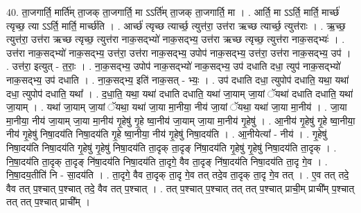 \documentclass[17pt]{extarticle}
\begin{document}
40. ता॒जगार्ति॒ मार्ति॑म् ता॒जक् ता॒जगार्ति॒ मा ऽऽर्ति॑म् ता॒जक् ता॒जगार्ति॒ मा । . आर्ति॒ मा ऽऽर्ति॒ मार्ति॒ मार्च्छ॑ त्यृच्छ॒ त्या ऽऽर्ति॒ मार्ति॒ मार्च्छ॑ति । . आर्च्छ॑ त्यृच्छ त्यार्च्छ॒ त्युत्त॑रा॒ उत्त॑रा ऋच्छ त्यार्च्छ॒ त्युत्त॑राः । . ऋ॒च्छ॒ त्युत्त॑रा॒ उत्त॑रा ऋच्छ त्यृच्छ॒ त्युत्त॑रा नाक॒सद्भ्यो॑ नाक॒सद्भ्य॒ उत्त॑रा ऋच्छ त्यृच्छ॒ त्युत्त॑रा नाक॒सद्भ्यः॑ । . उत्त॑रा नाक॒सद्भ्यो॑ नाक॒सद्भ्य॒ उत्त॑रा॒ उत्त॑रा नाक॒सद्भ्य॒ उपोप॑ नाक॒सद्भ्य॒ उत्त॑रा॒ उत्त॑रा नाक॒सद्भ्य॒ उप॑ । . उत्त॑रा॒ इत्युत् - त॒राः॒ । . ना॒क॒सद्भ्य॒ उपोप॑ नाक॒सद्भ्यो॑ नाक॒सद्भ्य॒ उप॑ दधाति दधा॒ त्युप॑ नाक॒सद्भ्यो॑ नाक॒सद्भ्य॒ उप॑ दधाति । . ना॒क॒सद्भ्य॒ इति॑ नाक॒सत् - भ्यः॒ । . उप॑ दधाति दधा॒ त्युपोप॑ दधाति॒ यथा॒ यथा॑ दधा॒ त्युपोप॑ दधाति॒ यथा᳚ । . द॒धा॒ति॒ यथा॒ यथा॑ दधाति दधाति॒ यथा॑ जा॒याम् जा॒यां ॅयथा॑ दधाति दधाति॒ यथा॑ जा॒याम् । . यथा॑ जा॒याम् जा॒यां ॅयथा॒ यथा॑ जा॒या मा॒नीया॒ नीय॑ जा॒यां ॅयथा॒ यथा॑ जा॒या मा॒नीय॑ । . जा॒या मा॒नीया॒ नीय॑ जा॒याम् जा॒या मा॒नीय॑ गृ॒हेषु॑ गृ॒हे ष्वा॒नीय॑ जा॒याम् जा॒या मा॒नीय॑ गृ॒हेषु॑ । . आ॒नीय॑ गृ॒हेषु॑ गृ॒हे ष्वा॒नीया॒ नीय॑ गृ॒हेषु॑ निषा॒दय॑ति निषा॒दय॑ति गृ॒हे ष्वा॒नीया॒ नीय॑ गृ॒हेषु॑ निषा॒दय॑ति । . आ॒नीयेत्या᳚ - नीय॑ । . गृ॒हेषु॑ निषा॒दय॑ति निषा॒दय॑ति गृ॒हेषु॑ गृ॒हेषु॑ निषा॒दय॑ति ता॒दृक् ता॒दृङ् नि॑षा॒दय॑ति गृ॒हेषु॑ गृ॒हेषु॑ निषा॒दय॑ति ता॒दृक् । . नि॒षा॒दय॑ति ता॒दृक् ता॒दृङ् नि॑षा॒दय॑ति निषा॒दय॑ति ता॒दृगे॒ वैव ता॒दृङ् नि॑षा॒दय॑ति निषा॒दय॑ति ता॒दृ गे॒व । . नि॒षा॒दय॒तीति॑ नि - सा॒दय॑ति । . ता॒दृगे॒ वैव ता॒दृक् ता॒दृ गे॒व तत् तदे॒व ता॒दृक् ता॒दृ गे॒व तत् । . ए॒व तत् तदे॒ वैव तत् प॒श्चात् प॒श्चात् तदे॒ वैव तत् प॒श्चात् । . तत् प॒श्चात् प॒श्चात् तत् तत् प॒श्चात् प्राची॒म् प्राची᳚म् प॒श्चात् तत् तत् प॒श्चात् प्राची᳚म् । \newline
\pagebreak
{}
\end{document}
